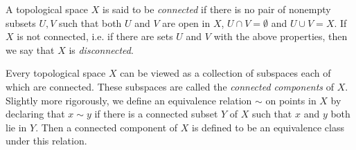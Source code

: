 \documentclass{article}
\begin{document}
A topological space $X$ is said to be \emph{connected} if there is no pair of nonempty subsets $U,V$ such that both $U$ and $V$ are open in $X$, $U \cap V=\emptyset$ and $U \cup V=X$. If $X$ is not connected, i.e. if there are sets $U$ and $V$ with the above properties, then we say that $X$ is \emph{disconnected}.

Every topological space $X$ can be viewed as a collection of subspaces each of which are connected.  These subspaces are called the \emph{connected components} of $X$.  Slightly more rigorously, we define an equivalence relation $\sim$ on points in $X$ by declaring that $x\sim y$ if there is a connected subset $Y$ of $X$ such that $x$ and $y$ both lie in $Y$.  Then a connected component of $X$ is defined to be an equivalence class under this relation.
\end{document}
